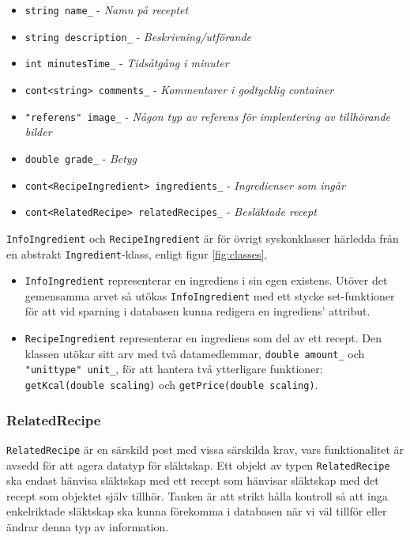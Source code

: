 \begin{itemize}
\item \verb+string name_+ - \emph{Namn på receptet}
\item \verb+string description_+ - \emph{Beskrivning/utförande}
\item \verb+int minutesTime_+ - \emph{Tidsåtgång i minuter}
\item \verb+cont<string> comments_+ - \emph{Kommentarer i godtycklig container}
\item \verb+"referens" image_+ - \emph{Någon typ av referens för implentering av tillhörande bilder}
\item \verb+double grade_+ - \emph{Betyg}
\end{itemize}

\begin{itemize}
\item \verb+cont<RecipeIngredient> ingredients_+ - \emph{Ingredienser som ingår}
\item \verb+cont<RelatedRecipe> relatedRecipes_+ - \emph{Besläktade recept}
\end{itemize}
%
\verb+InfoIngredient+ och \verb+RecipeIngredient+ är för övrigt syskonklasser härledda från en abstrakt \verb+Ingredient+-klass, enligt figur \ref{fig:classes}. %

\begin{itemize}
\item \verb+InfoIngredient+ representerar en ingrediens i sin egen existens. Utöver det gemensamma arvet så utökas \verb+InfoIngredient+ med ett stycke set-funktioner för att vid sparning i databasen kunna redigera en ingrediens' attribut. 
\item \verb+RecipeIngredient+ representerar en ingrediens som del av ett recept. Den klassen utökar sitt arv med två datamedlemmar, \verb+double amount_+ och \verb+"unittype" unit_+, för att hantera två ytterligare funktioner: \verb+getKcal(double scaling)+ och \verb+getPrice(double scaling)+.
\end{itemize}
 
\subsubsection{RelatedRecipe}
\verb+RelatedRecipe+ är en särskild post med vissa särskilda krav, vars funktionalitet är avsedd för att agera datatyp för släktskap. Ett objekt av typen \verb+RelatedRecipe+ ska endast hänvisa släktskap med ett recept som hänvisar släktskap med det recept som objektet själv tillhör. Tanken är att strikt hålla kontroll så att inga enkelriktade släktskap ska kunna förekomma i databasen när vi väl tillför eller ändrar denna typ av information.

